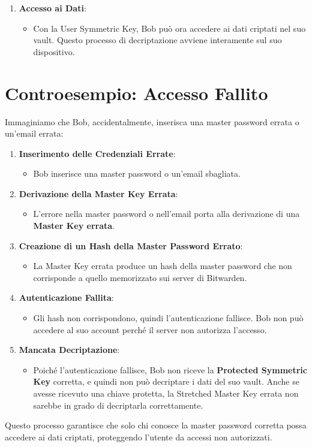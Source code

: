\documentclass[a4paper,12pt]{report}
\begin{document}
\begin{enumerate}
					\item \textbf{Accesso ai Dati}:
					\begin{itemize}
						\item Con la User Symmetric Key, Bob può ora accedere ai dati criptati nel suo vault. Questo processo di decriptazione avviene interamente sul suo dispositivo.
					\end{itemize}
				\end{enumerate}

				\section*{Controesempio: Accesso Fallito}

				Immaginiamo che Bob, accidentalmente, inserisca una master password errata o un'email errata:

				\begin{enumerate}
					\item \textbf{Inserimento delle Credenziali Errate}:
					\begin{itemize}
						\item Bob inserisce una master password o un'email sbagliata.
					\end{itemize}

					\item \textbf{Derivazione della Master Key Errata}:
					\begin{itemize}
						\item L'errore nella master password o nell'email porta alla derivazione di una \textbf{Master Key errata}.
					\end{itemize}

					\item \textbf{Creazione di un Hash della Master Password Errato}:
					\begin{itemize}
						\item La Master Key errata produce un hash della master password che non corrisponde a quello memorizzato sui server di Bitwarden.
					\end{itemize}

					\item \textbf{Autenticazione Fallita}:
					\begin{itemize}
						\item Gli hash non corrispondono, quindi l'autenticazione fallisce. Bob non può accedere al suo account perché il server non autorizza l'accesso.
					\end{itemize}

					\item \textbf{Mancata Decriptazione}:
					\begin{itemize}
						\item Poiché l'autenticazione fallisce, Bob non riceve la \textbf{Protected Symmetric Key} corretta, e quindi non può decriptare i dati del suo vault. Anche se avesse ricevuto una chiave protetta, la Stretched Master Key errata non sarebbe in grado di decriptarla correttamente.
					\end{itemize}
				\end{enumerate}

				Questo processo garantisce che solo chi conosce la master password corretta possa accedere ai dati criptati, proteggendo l'utente da accessi non autorizzati.

			
			\renewcommand{\bibsection}{}
			
	
\end{document}
